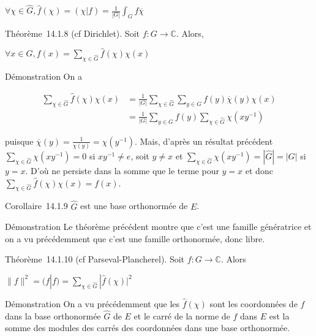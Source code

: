 $\forall \chi \in \hat{G},
\hat{f}(\chi) = (\chi|f) =
\frac{1}{|G|} \int_G f \overline{\chi}$

Théorème~14.1.8 (cf Dirichlet). Soit $f : G \rightarrow \mathbb{C}$. Alors,

$\forall x \in G, f(x) = \sum_{\chi \in \hat{G}} \hat{f}(\chi)\chi(x)$

Démonstration On a

\begin{align*}
\sum_{\chi \in \hat{G}} \hat{f}(\chi)\chi(x) &= \frac{1}{|G|}
\sum_{\chi \in \hat{G}} \sum_{y \in G} f(y) \overline{\chi}(y) \chi(x) \\
&= \frac{1}{|G|} \sum_{y \in G} f(y) \sum_{\chi \in \hat{G}} \chi(xy^{-1})
\end{align*}

puisque $\overline{\chi}(y) = \frac{1}{\chi(y)} = \chi(y^{-1})$. Mais, d'après un résultat précédent
$\sum_{\chi \in \hat{G}} \chi(xy^{-1}) = 0$ si
$xy^{-1} \neq e$, soit
$y \neq x$ et
$\sum_{\chi \in \hat{G}} \chi(xy^{-1}) =
|\hat{G}| = |G|$ si
$y = x$. D'où ne persiste dans la somme que le terme pour $y = x$ et donc
$\sum_{\chi \in \hat{G}} \hat{f}(\chi)\chi(x) = f(x)$.

Corollaire~14.1.9 $\hat{G}$ est une base orthonormée de $E$.

Démonstration Le théorème précédent montre que c'est une famille
génératrice et on a vu précédemment que c'est une famille orthonormée,
donc libre.

Théorème~14.1.10 (cf Parseval-Plancherel). Soit $f : G \rightarrow \mathbb{C}$. Alors

$\|f\|^2 =
(f|f) = \sum_{\chi \in \hat{G}} |\hat{f}(\chi)|^2$

Démonstration On a vu précédemment que les $\hat{f}(\chi)$
sont les coordonnées de $f$ dans la base orthonormée
$\hat{G}$ de $E$ et le carré de la norme de $f$ dans $E$ est la
somme des modules des carrés des coordonnées dans une base orthonormée.